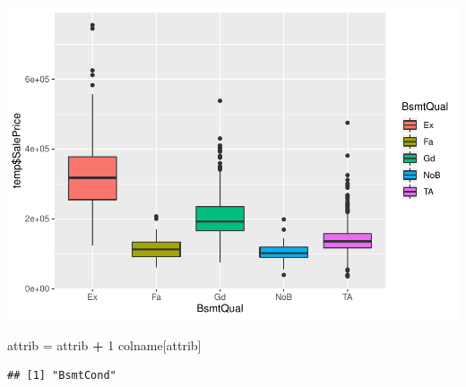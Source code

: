 \documentclass[]{article}
\newenvironment{Shaded}{\begin{snugshade}}{\end{snugshade}}
\newcommand{\DecValTok}[1]{\textcolor[rgb]{0.00,0.00,0.81}{#1}}
\newcommand{\StringTok}[1]{\textcolor[rgb]{0.31,0.60,0.02}{#1}}
\newcommand{\OperatorTok}[1]{\textcolor[rgb]{0.81,0.36,0.00}{\textbf{#1}}}
\newcommand{\NormalTok}[1]{#1}
\begin{document}
\includegraphics{EDA_files/figure-latex/unnamed-chunk-53-1.pdf}

\begin{Shaded}
\begin{Highlighting}[]
\NormalTok{attrib =}\StringTok{ }\NormalTok{attrib }\OperatorTok{+}\StringTok{ }\DecValTok{1}
\NormalTok{colname[attrib]}
\end{Highlighting}
\end{Shaded}

\begin{verbatim}
## [1] "BsmtCond"
\end{verbatim}
\end{document}
